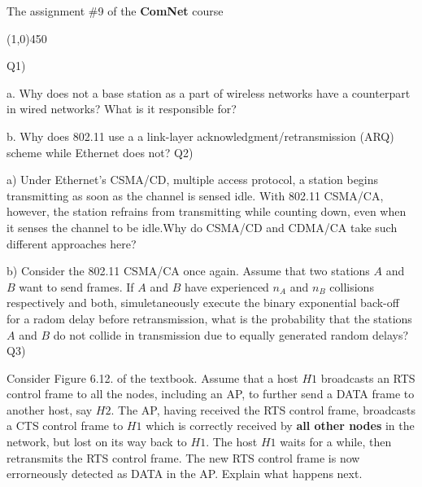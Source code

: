 \documentclass[10pt,letterpaper]{article}
\newcommand{\hl}{
\begin{center}
\line(1,0){450}
\end{center}}
\newcommand{\nl}{\newline\newline}
\begin{document}
\Large
\begin{center}
The assignment \#9 of the \textbf{ComNet} course
\hl
\end{center}
Q1) 

a. Why does not a base station as a part of wireless networks have a counterpart in wired networks? What is it responsible for?

b. Why does 802.11 use a a link-layer acknowledgment/retransmission (ARQ) scheme while Ethernet does not?
\nl
Q2)

a) Under Ethernet's CSMA/CD, multiple access protocol, a station begins transmitting as soon as the channel is sensed idle. With 802.11 CSMA/CA, however, the station refrains from transmitting while counting down, even when it senses the channel to be idle.Why do CSMA/CD and CDMA/CA take such different approaches here?

b) Consider the 802.11 CSMA/CA once again. Assume that two stations $A$ and $B$ want to send frames. If $A$ and $B$ have experienced $n_A$ and $n_B$ collisions respectively and both, simuletaneously execute the binary exponential back-off for a radom delay before retransmission, what is the probability that the stations $A$ and $B$ do not collide in transmission due to equally generated random delays?
\nl
Q3)

Consider Figure 6.12. of the textbook. Assume that a host $H1$ broadcasts an RTS control frame to all the nodes, including an AP, to further send a DATA frame to another host, say $H2$. The AP, having received the RTS control frame, broadcasts a CTS control frame to $H1$
 which is correctly received by \textbf{all other nodes} in the network, but lost on its way back to $H1$. The host $H1$ waits for a while, then retransmits the RTS control frame. The new RTS control frame is now errorneously detected as DATA in the AP. Explain what happens next.
%
\end{document}
